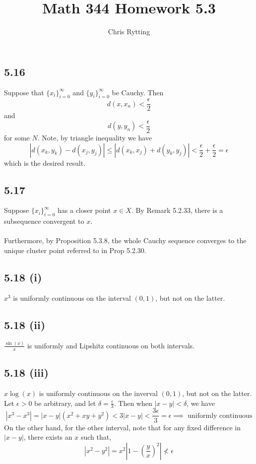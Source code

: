 \documentclass[letterpaper,12pt]{article}
\theoremstyle{definition}
\begin{document}
\title{Math 344 Homework 5.3}
\author{Chris Rytting}
\maketitle

\subsection*{5.16}


Suppose that $\{x_i\}_{i=0}^\infty$ and  $\{y_i\}_{i=0}^\infty$ be Cauchy. Then 
\[d(x,x_n)<\frac{\epsilon}{2}\]
and 
\[d(y,y_n) < \frac{\epsilon}{2}\] 
for some $N$. Note, by triangle inequality we have
\[|d(x_k,y_k) - d(x_j, y_j)| \leq |d(x_k, x_j)+d(y_k,y_j)| < \frac{\epsilon}{2} + \frac{\epsilon}{2} = \epsilon\]
which is the desired result.
 
\subsection*{5.17}
Suppose $\{x_i\}_{i=0}^\infty$ has a closer point $x \in X$. By Remark 5.2.33, there is a subsequence convergent to $x$.\\\\
Furthermore, by Proposition 5.3.8, the whole Cauchy sequence converges to the unique cluster point referred to in Prop 5.2.30.

\subsection*{5.18 (i)}
$x^3$ is uniformly continuous on the interval $(0,1)$, but not on the latter.
\subsection*{5.18 (ii)}
$\frac{\sin(x)}{x} $ is uniformly and Lipshitz continuous on both intervals.
\subsection*{5.18 (iii)}
    $x \log(x)$ is uniformly continuous on the inverval $(0,1)$, but not on the latter.
Let $\epsilon >0$ be arbitrary, and let $\delta = \frac{\epsilon}{3}$. Then when $|x-y| < \delta$, we have
\[ |x^3 - x^3 | = |x-y|(x^2+xy +y^2)<3|x-y| < \frac{3\epsilon}{3} = \epsilon \implies \text{ uniformly continuous}\]
On the other hand, for the other interval, note that for any fixed difference in $|x-y|$, 
there exists an $x$ such that,
\[|x^2 - y^2| = x^2|1-\left( \frac{y}{x} \right)^2| \not < \epsilon \]
\end{document}
